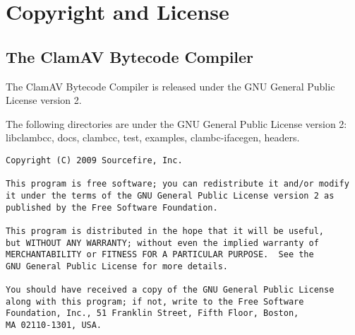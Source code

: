 \chapter{Copyright and License}
\section{The ClamAV Bytecode Compiler}
The ClamAV Bytecode Compiler is released under the GNU General Public License
version 2.

The following directories are under the GNU General Public License version 2:
libclambcc, docs, clambcc, test, examples, clambc-ifacegen, headers.

{\footnotesize
\begin{verbatim}
Copyright (C) 2009 Sourcefire, Inc.

This program is free software; you can redistribute it and/or modify
it under the terms of the GNU General Public License version 2 as
published by the Free Software Foundation.

This program is distributed in the hope that it will be useful,
but WITHOUT ANY WARRANTY; without even the implied warranty of
MERCHANTABILITY or FITNESS FOR A PARTICULAR PURPOSE.  See the
GNU General Public License for more details.

You should have received a copy of the GNU General Public License
along with this program; if not, write to the Free Software
Foundation, Inc., 51 Franklin Street, Fifth Floor, Boston,
MA 02110-1301, USA.
\end{verbatim}
}


